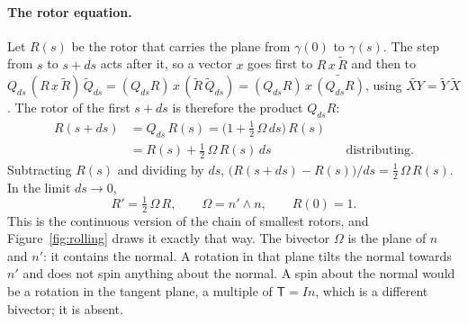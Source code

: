 \paragraph{The rotor equation.} Let $R(s)$ be the rotor that carries the plane from $\gamma(0)$ to $\gamma(s)$. The step from $s$ to $s + ds$ acts after it, so a vector $x$ goes first to $R\,x\,\widetilde R$ and then to $Q_{ds}\,(R\,x\,\widetilde R)\,\widetilde Q_{ds} = (Q_{ds}R)\,x\,(\widetilde R\,\widetilde Q_{ds}) = (Q_{ds}R)\,x\,\widetilde{(Q_{ds}R)}$, using $\widetilde{XY} = \widetilde Y\,\widetilde X$. The rotor of the first $s + ds$ is therefore the product $Q_{ds}R$:
\begin{align*}
R(s + ds) &= Q_{ds}\, R(s) = \big(1 + \tfrac12\,\Omega\, ds\big)\, R(s) \\
&= R(s) + \tfrac12\,\Omega\, R(s)\, ds && \text{distributing.}
\end{align*}
Subtracting $R(s)$ and dividing by $ds$, $\big(R(s + ds) - R(s)\big)/ds = \frac12\,\Omega\, R(s)$.
In the limit $ds\to 0$,
\begin{equation*}
R' = \tfrac12\, \Omega\, R, \qquad \Omega = n'\wedge n, \qquad R(0) = 1 .
\end{equation*}
This is the continuous version of the chain of smallest rotors, and Figure~\ref{fig:rolling} draws it exactly that way. The bivector $\Omega$ is the plane of $n$ and $n'$: it contains the normal. A rotation in that plane tilts the normal towards $n'$ and does not spin anything about the normal. A spin about the normal would be a rotation in the tangent plane, a multiple of $\mathsf T = In$, which is a different bivector; it is absent.

